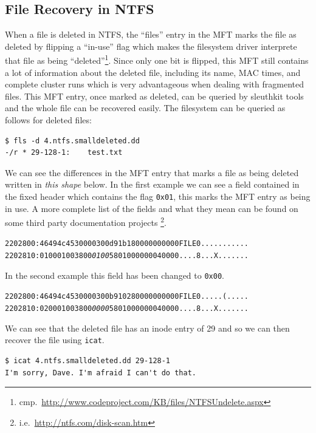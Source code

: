 \documentclass[a4paper,
    11pt,
    normalheadings,
    parindent,
    UKenglish,
    abstracton,
    ]{scrartcl}
\begin{document}
\subsection{File Recovery in NTFS}
When a file is deleted in NTFS, the ``files'' entry in the MFT marks the file as deleted by flipping a ``in-use'' flag which makes the filesystem driver interprete that file as being ``deleted''\footnote{cmp.\, \url{http://www.codeproject.com/KB/files/NTFSUndelete.aspx}}.
Since only one bit is flipped, this MFT still contains a lot of information about the deleted file, including its name, MAC times, and complete cluster runs which is very advantageous when dealing with fragmented files.
This MFT entry, once marked as deleted, can be queried by sleuthkit tools and the whole file can be recovered easily.
The filesystem can be queried as follows for deleted files:
%
\begin{verbatim}
$ fls -d 4.ntfs.smalldeleted.dd
-/r * 29-128-1:    test.txt
\end{verbatim}

We can see the differences in the MFT entry that marks a file as being deleted written in \emph{this shape} below.
In the first example we can see a field contained in the fixed header which contains the flag \texttt{0x01}, this marks the MFT entry as being in use.
A more complete list of the fields and what they mean can be found on some third party documentation projects \footnote{i.e.\, \url{http://ntfs.com/disk-scan.htm}}.
\begin{alltt}
2202800: 4649 4c45 3000 0300 d91b 1800 0000 0000  FILE0...........
2202810: 0100 0100 3800 \emph{0100} 5801 0000 0004 0000  ....8...X.......
\end{alltt}
In the second example this field has been changed to \texttt{0x00}.
\begin{alltt}
2202800: 4649 4c45 3000 0300 b910 2800 0000 0000  FILE0.....(.....
2202810: 0200 0100 3800 \emph{0000} 5801 0000 0004 0000  ....8...X.......
\end{alltt}

We can see that the deleted file has an inode entry of 29 and so we can then recover the file using \texttt{icat}.
\begin{verbatim}
$ icat 4.ntfs.smalldeleted.dd 29-128-1
I'm sorry, Dave. I'm afraid I can't do that.
\end{verbatim}
\end{document}
